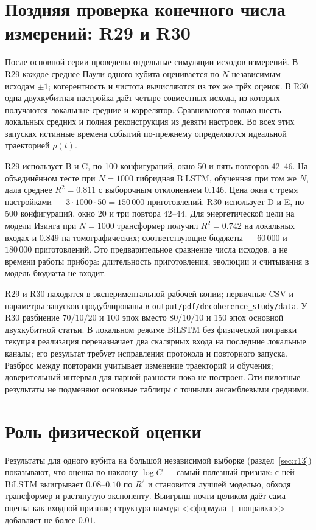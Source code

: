 \documentclass[12pt,a4paper]{report}
\numberwithin{equation}{chapter}
\begin{document}
\section{Поздняя проверка конечного числа измерений: R29 и R30}
\label{sec:finite_shots_update}

После основной серии проведены отдельные симуляции исходов измерений.
В R29 каждое среднее Паули одного кубита оценивается по $N$ независимым
исходам $\pm1$; когерентность и чистота вычисляются из тех же трёх оценок.
В R30 одна двухкубитная настройка даёт четыре совместных исхода, из которых
получаются локальные средние и коррелятор. Сравниваются только шесть
локальных средних и полная реконструкция из девяти настроек. Во всех этих
запусках истинные времена событий по-прежнему определяются идеальной
траекторией $\rho(t)$.

R29 использует B и C, по 100 конфигураций, окно 50 и пять повторов 42--46.
На объединённом тесте при $N=1000$ гибридная BiLSTM, обученная при том же
$N$, дала среднее $R^2=0.811$ с выборочным отклонением $0.146$. Цена окна
с тремя настройками --- $3\cdot1000\cdot50=150\,000$ приготовлений.
R30 использует D и E, по 500 конфигураций, окно 20 и три повтора 42--44.
Для энергетической цели на модели Изинга при $N=1000$ трансформер получил
$R^2=0.742$ на локальных входах и $0.849$ на томографических; соответствующие
бюджеты --- $60\,000$ и $180\,000$ приготовлений. Это предварительное
сравнение числа исходов, а не времени работы прибора: длительность
приготовления, эволюции и считывания в модель бюджета не входит.

R29 и R30 находятся в экспериментальной рабочей копии; первичные CSV и
параметры запусков продублированы в
\texttt{output/pdf/decoherence\_study/data}. У R30 разбиение $70/10/20$ и
100 эпох вместо $80/10/10$ и 150 эпох основной двухкубитной статьи. В
локальном режиме BiLSTM без физической поправки текущая реализация
переназначает два скалярных входа на последние локальные каналы; его
результат требует исправления протокола и повторного запуска. Разброс между
повторами учитывает изменение траекторий и обучения; доверительный интервал
для парной разности пока не построен. Эти пилотные результаты не
подменяют основные таблицы с точными ансамблевыми средними.

\section{Роль физической оценки}

Результаты для одного кубита на большой независимой выборке
(раздел~\ref{sec:r13}) показывают, что оценка по наклону $\log C$ --- самый
полезный признак: с ней BiLSTM выигрывает $0.08$--$0.10$ по $R^2$ и
становится лучшей моделью, обходя трансформер и растянутую экспоненту.
Выигрыш почти целиком даёт сама оценка как входной признак; структура
выхода <<формула $+$ поправка>> добавляет не более $0.01$.
\end{document}
